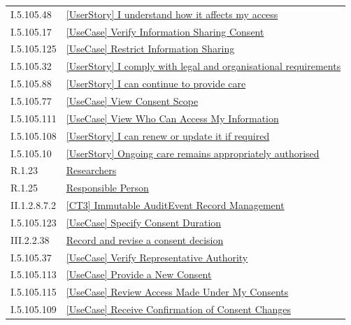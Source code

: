 \begin{longtable}{p{.22\linewidth}p{.73\linewidth}}
I.5.105.48 & \hyperref[element:547b657cae274cedbb5cd2c91b063305]{[UserStory] I understand how it affects my access} \\
I.5.105.17 & \hyperref[element:5e6e04a1d2dc44578bcf69dfbafdd0fb]{[UseCase] Verify Information Sharing Consent} \\
I.5.105.125 & \hyperref[element:5ed1f1d94fbf40dab41b7674771c2019]{[UseCase] Restrict Information Sharing} \\
I.5.105.32 & \hyperref[element:60e10794eab54e3981a5c8bc6b9c2518]{[UserStory] I comply with legal and organisational requirements} \\
I.5.105.88 & \hyperref[element:64de5c5939a8458fabdcbf24c64bd9c0]{[UserStory] I can continue to provide care} \\
I.5.105.77 & \hyperref[element:66a698a0574941a6977dcd8944702068]{[UseCase] View Consent Scope} \\
I.5.105.111 & \hyperref[element:688e4458140f47168a2443e23d7a6491]{[UseCase] View Who Can Access My Information} \\
I.5.105.108 & \hyperref[element:6abb28d8e33940c8a0fab40883ac6f3e]{[UserStory] I can renew or update it if required} \\
I.5.105.10 & \hyperref[element:6aee962a21a941fea94ee42a9b9c0368]{[UserStory] Ongoing care remains appropriately authorised} \\
R.1.23 & \hyperref[element:6fd625e259a84f7fa3c7376f6bb95527]{Researchers} \\
R.1.25 & \hyperref[element:705ed4e6d6bd4bb3a734d429943c62de]{Responsible Person} \\
II.1.2.8.7.2 & \hyperref[element:70e9f760ebd34045b8dd92f31fb8a00b]{[CT3] Immutable AuditEvent Record Management} \\
I.5.105.123 & \hyperref[element:73a6e1df10434445b20622086cc92783]{[UseCase] Specify Consent Duration} \\
III.2.2.38 & \hyperref[element:74779c85619741d18053a2304457190b]{Record and revise a consent decision} \\
I.5.105.37 & \hyperref[element:74824354f2534bf190d9b77423d380d9]{[UseCase] Verify Representative Authority} \\
I.5.105.113 & \hyperref[element:7598aa19a5b64279b8e75efb9b2f8cc6]{[UseCase] Provide a New Consent} \\
I.5.105.115 & \hyperref[element:77350168daa340c3b9b1305d6eb46c39]{[UseCase] Review Access Made Under My Consents} \\
I.5.105.109 & \hyperref[element:7b753b61eede4f32b0522feb0d24d404]{[UseCase] Receive Confirmation of Consent Changes} \\

\end{longtable}
